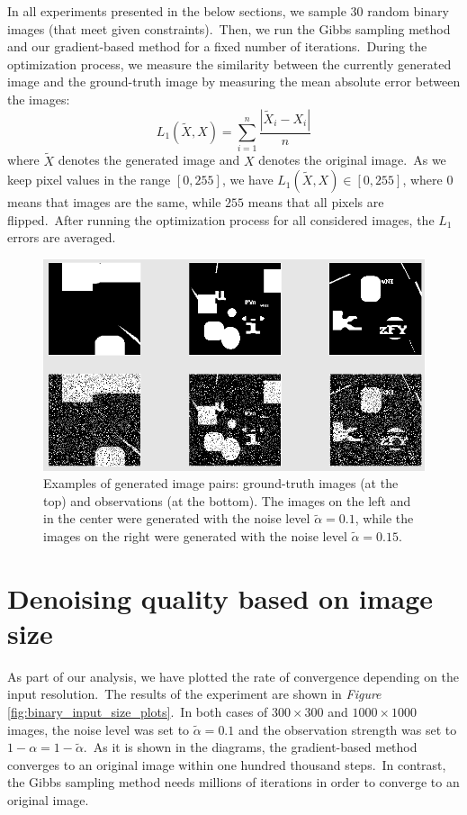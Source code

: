 \documentclass[shortabstract, english, lic]{iithesis}
\theoremstyle{default_theorem_style}\newtheorem{theorem}{Theorem}
\theoremstyle{default_theorem_style}\newtheorem{definition}{Definition}
\begin{document}
\noindent In all experiments presented in the below sections, we sample 30 random binary images
(that meet given constraints).\ Then, we run the Gibbs sampling method and our gradient-based method for a
fixed number of iterations.\ During the optimization process, we measure the similarity between the currently
generated image and the ground-truth image by measuring the mean absolute error between the images:
$$
L_1(\tilde{X}, X) = \sum\limits_{i = 1}^n \frac{|\tilde{X}_i - X_i|}{n}
$$
where $\tilde{X}$ denotes the generated image and $X$ denotes the original image.\ As we keep pixel values in the
range $[0, 255]$, we have $L_1(\tilde{X}, X) \in [0, 255]$, where $0$ means that images are the same, while
$255$ means that all pixels are flipped.\ After running the optimization process for all considered images, the
$L_1$ errors are averaged.\newline\newline\newline

\begin{figure}[H]
\centering
\includegraphics[scale=0.475]{binary_data_examples}
\caption{Examples of generated image pairs: ground-truth images (at the top) and observations (at the bottom).
The images on the left and in the center were generated with the noise level $\tilde{\alpha} = 0.1$, while the
images on the right were generated with the noise level $\tilde{\alpha} = 0.15$.}
\label{fig:binary_data_examples}
\end{figure}

\section{Denoising quality based on image size}

As part of our analysis, we have plotted the rate of convergence depending on the input resolution.\ The
results of the experiment are shown in \textit{Figure} \ref{fig:binary_input_size_plots}.\ In
both cases of $300{\times}300$ and $1000{\times}1000$ images, the noise level was set to $\tilde{\alpha} = 0.1$
and the observation strength was set to $1 - \alpha = 1 - \tilde{\alpha}$.\ As it is shown in the diagrams,
the gradient-based method converges to an original image within one hundred thousand steps.\ In contrast,
the Gibbs sampling method needs millions of iterations in order to converge to an original image.
\end{document}
